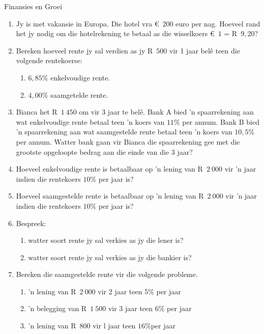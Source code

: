 \begin{eocexercises}{Finansies en Groei}
    \begin{enumerate}[label=\textbf{\arabic*}.]
	\item Jy is met vakansie in Europa. Die hotel vra €~$200$ euro per nag. Hoeveel rand het jy nodig om die hotelrekening te betaal as die wisselkoers  €~$1$ = R~$9,20$?

	\item Bereken hoeveel rente jy sal verdien as jy R~$500$ vir 1 jaar belê teen die volgende rentekoerse:
	\begin{enumerate}
	    \item $6,85\%$ enkelvoudige rente.
	    \item $4,00\%$ saamgetelde rente.
	\end{enumerate}

	\item Bianca het R~$1~450$ om vir 3 jaar te belê. Bank A bied ’n spaarrekening aan wat enkelvoudige rente betaal
teen ’n koers van $11\%$ per annum. Bank B bied ’n spaarrekening aan wat saamgestelde rente betaal
teen ’n koers van $10,5\%$ per annum. Watter bank gaan vir Bianca die spaarrekening gee met die grootste
opgeloopte bedrag aan die einde van die 3 jaar?

	\item Hoeveel enkelvoudige rente is betaalbaar op ’n lening van R~$2~000$ vir ’n jaar indien die rentekoers $10\%$ per jaar is?

	\item Hoeveel saamgestelde rente is betaalbaar op ’n lening van  R~$2~000$ vir ’n jaar indien die rentekoers $10\%$ per jaar is?

	\item Bespreek:
	\begin{enumerate}
	    \item watter soort rente jy sal verkies as jy die lener is?

	    \item watter soort rente jy sal verkies as jy die bankier is?
	\end{enumerate}

	\item Bereken die saamgestelde rente vir die volgende probleme.
	\begin{enumerate}
	    \item ’n lening van R~$2~000$ vir 2 jaar teen  $5\%$ per jaar
	    \item ’n belegging van  R~$1~500$ vir 3 jaar teen $6\%$ per jaar
	    \item ’n lening van R~$800$ vir l jaar teen $16\%$per jaar
	\end{enumerate}


\end{enumerate}
\end{eocexercises}
